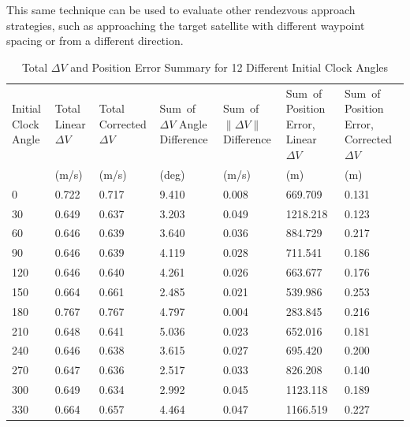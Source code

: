 \documentclass[letterpaper, preprint, paper,11pt]{AAS}	%
\begin{document}
This same technique can be used to evaluate other rendezvous approach strategies, such as approaching the target satellite with different waypoint spacing or from a different direction.

\begin{table}[h] 
	\begin{center}
		\begin{tabular}{p{0.9 cm} p{0.8 cm} p{1.2 cm} p{1 cm} p{1 cm} p{1.3cm} p{1.3cm}}
			Initial Clock \mbox{Angle} & Total \mbox{Linear} \(\Delta V\) & Total \mbox{Corrected} \(\Delta V\) & \mbox{Sum of} \(\Delta V\) Angle Difference & \mbox{Sum of} \(\|\Delta V \|\) Difference & \mbox{Sum of} Position Error, Linear \(\Delta V\) & \mbox{Sum of} Position Error, \mbox{Corrected} \(\Delta V\)\\
			& (m/s) & (m/s) & (deg) & (m/s) & (m) & (m) \\
			0	& 0.722	& 0.717	& 9.410	& 0.008	& 669.709	& 0.131 \\
			30	& 0.649	& 0.637	& 3.203	& 0.049	& 1218.218	& 0.123 \\
			60	& 0.646	& 0.639	& 3.640	& 0.036	& 884.729	& 0.217 \\
			90	& 0.646	& 0.639	& 4.119	& 0.028	& 711.541	& 0.186 \\
			120	& 0.646	& 0.640	& 4.261	& 0.026	& 663.677	& 0.176 \\
			150	& 0.664	& 0.661	& 2.485	& 0.021	& 539.986	& 0.253 \\
			180	& 0.767	& 0.767	& 4.797	& 0.004	& 283.845	& 0.216 \\
			210	& 0.648	& 0.641	& 5.036	& 0.023	& 652.016	& 0.181 \\
			240	& 0.646	& 0.638	& 3.615	& 0.027	& 695.420	& 0.200 \\
			270	& 0.647	& 0.636	& 2.517	& 0.033	& 826.208	& 0.140 \\
			300	& 0.649	& 0.634	& 2.992	& 0.045	& 1123.118	& 0.189 \\
			330	& 0.664	& 0.657	& 4.464	& 0.047	& 1166.519	& 0.227 \\
		\end{tabular}
		\caption{Total \(\Delta V\) and Position Error Summary for 12 Different Initial Clock Angles}
		\label{tab:Results_2}
	\end{center}
\end{table}
\end{document}
